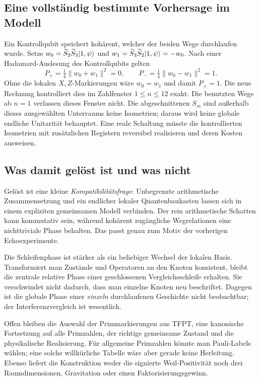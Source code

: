 \subsection{Eine vollständig bestimmte Vorhersage im Modell}
Ein Kontrollqubit speichert kohärent, welcher der beiden Wege durchlaufen wurde. Setze $w_0=\widetilde S_2\widetilde S_3\lvert1,\psi\rangle$ und $w_1=\widetilde S_3\widetilde S_2\lvert1,\psi\rangle=-w_0$. Nach einer Hadamard-Auslesung des Kontrollqubits gelten
\[
 P_+=\tfrac14\|w_0+w_1\|^2=0,
 \qquad P_-=\tfrac14\|w_0-w_1\|^2=1.
\]
Ohne die lokalen $X,Z$-Markierungen wäre $w_0=w_1$ und damit $P_+=1$. Die neue Rechnung kontrolliert dies im Zahlfenster $1\leq n\leq12$ exakt. Die benutzten Wege ab $n=1$ verlassen dieses Fenster nicht. Die abgeschnittenen $S_m$ sind außerhalb dieses ausgewählten Unterraums keine Isometrien; daraus wird keine globale endliche Unitarität behauptet. Eine reale Schaltung müsste die kontrollierten Isometrien mit zusätzlichen Registern reversibel realisieren und deren Kosten ausweisen.

\subsection{Was damit gelöst ist und was nicht}
Gelöst ist eine kleine \emph{Kompatibilitätsfrage}: Unbegrenzte arithmetische Zusammensetzung und ein endlicher lokaler Quantenbaukasten lassen sich in einem expliziten gemeinsamen Modell verbinden. Der rein arithmetische Schatten kann kommutativ sein, während kohärent zugängliche Wegrelationen eine nichttriviale Phase behalten. Das passt genau zum Motiv der vorherigen Echoexperimente.

Die Schleifenphase ist stärker als ein beliebiger Wechsel der lokalen Basis. Transformiert man Zustände und Operatoren an den Knoten konsistent, bleibt die zentrale relative Phase einer geschlossenen Vergleichsschleife erhalten. Sie verschwindet nicht dadurch, dass man einzelne Knoten neu beschriftet. Dagegen ist die globale Phase einer \emph{einzeln} durchlaufenen Geschichte nicht beobachtbar; der Interferenzvergleich ist wesentlich.

Offen bleiben die Auswahl der Primmarkierungen aus TFPT, eine kanonische Fortsetzung auf alle Primzahlen, der richtige gemeinsame Zustand und die physikalische Realisierung. Für allgemeine Primzahlen könnte man Pauli-Labels wählen; eine solche willkürliche Tabelle wäre aber gerade keine Herleitung. Ebenso liefert die Konstruktion weder die signierte Weil-Positivität noch drei Raumdimensionen, Gravitation oder einen Faktorisierungsgewinn.

